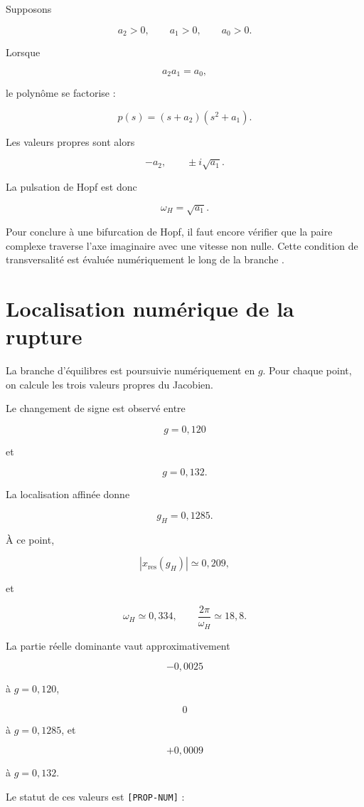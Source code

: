 Supposons

\[
a_2>0,
\qquad
a_1>0,
\qquad
a_0>0.
\]

Lorsque

\[
a_2a_1=a_0,
\]

le polynôme se factorise :

\[
p(s)
=
(s+a_2)(s^2+a_1).
\]

Les valeurs propres sont alors

\[
-a_2,
\qquad
\pm i\sqrt{a_1}.
\]

La pulsation de Hopf est donc

\[
\boxed{
\omega_H=\sqrt{a_1}.
}
\]

Pour conclure à une bifurcation de Hopf, il faut encore vérifier que la
paire complexe traverse l'axe imaginaire avec une vitesse non nulle.
Cette condition de transversalité est évaluée numériquement le long de
la branche \cite{kuznetsov2004elements}.

\section{Localisation numérique de la rupture}
\label{annexe-resistance-hopf-numerique}

La branche d'équilibres est poursuivie numériquement en \(g\). Pour
chaque point, on calcule les trois valeurs propres du Jacobien.

Le changement de signe est observé entre

\[
g=0{,}120
\]

et

\[
g=0{,}132.
\]

La localisation affinée donne

\[
\boxed{
g_H
=
0{,}1285.
}
\]

À ce point,

\[
|x_{\mathrm{res}}(g_H)|
\simeq
0{,}209,
\]

et

\[
\boxed{
\omega_H
\simeq
0{,}334,
\qquad
\frac{2\pi}{\omega_H}
\simeq
18{,}8.
}
\]

La partie réelle dominante vaut approximativement

\[
-0{,}0025
\]

à \(g=0{,}120\),

\[
0
\]

à \(g=0{,}1285\), et

\[
+0{,}0009
\]

à \(g=0{,}132\).

Le statut de ces valeurs est \texttt{[PROP-NUM]} :


